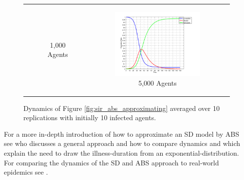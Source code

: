 \begin{figure}
\begin{center}
\begin{tabular}{c c c}
\begin{subfigure}[b]{0.3\textwidth}
			\caption{1,000 Agents}
			\label{fig:sir_abs_agents_repls_1000}
		\end{subfigure}
    	&
		\begin{subfigure}[b]{0.3\textwidth}
			\centering
			\includegraphics[width=1\textwidth, angle=0]{./../shared/fig/frabs/SIR_5000agents_150t_01dt_parallel_10replications.png}
			\caption{5,000 Agents}
			\label{fig:sir_abs_agents_repls_10000}
		\end{subfigure}
	\end{tabular}
	
	\caption{Dynamics of Figure \ref{fig:sir_abs_approximating} averaged over 10 replications with initially 10 infected agents.} 
	\label{fig:sir_abs_agents_repls}
\end{center}
\end{figure}

For a more in-depth introduction of how to approximate an SD model by ABS see \cite{macal_agent-based_2010} who discusses a general approach and how to compare dynamics and \cite{borshchev_system_2004} which explain the need to draw the illness-duration from an exponential-distribution. For comparing the dynamics of the SD and ABS approach to real-world epidemics see \cite{ahmed_variance_2013}.